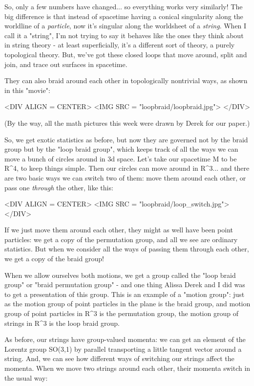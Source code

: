 So, only a few numbers have changed... so everything works very
similarly!  The big difference is that instead of spacetime having a
conical singularity along the worldline of a \emph{particle}, now
it's singular along the worldsheet of a \emph{string}.  When I call
it a "string", I'm not trying to say it behaves like the
ones they think about in string theory - at least superficially, it's
a different sort of theory, a purely topological theory. But, we've
got these closed loops that move around, split and join, and trace out
surfaces in spacetime.

They can also braid around each other in topologically nontrivial
ways, as shown in this "movie": 

<DIV ALIGN = CENTER>
<IMG SRC = "loopbraid/loopbraid.jpg">
</DIV>

(By the way, all the math pictures this week were drawn by 
Derek for our paper.)

So, we get exotic statistics as before, but now they are governed not by
the braid group but by the "loop braid group", which keeps
track of all the ways we can move a bunch of circles around in 3d
space.  Let's take our spacetime M to be R^{4}, to keep things simple.
Then our circles can move around in R^{3}... and there are 
two basic ways we can switch two of them: move them around each other, 
or pass one \emph{through} the other, like this:

<DIV ALIGN = CENTER>
<IMG SRC = "loopbraid/loop_switch.jpg">
</DIV>

If we just move them around each other, they might as well have been 
point particles: we get a copy of the permutation group, and all we see 
are ordinary statistics.  But when we consider all the ways of passing
them through each other, we get a copy of the braid group!  

When we allow ourselves both motions, we get a group called the
"loop braid group" or "braid permutation group" -
and one thing Alissa Derek and I did was to get a presentation of this
group.  This is an example of a "motion group": just as the
motion group of point particles in the plane is the braid group, and
motion group of point particles in R^{3} is the permutation group, the
motion group of strings in R^{3} is the loop braid group.

As before, our strings have group-valued momenta: we can get an 
element of the Lorentz group SO(3,1) by parallel transporting a
little tangent vector around a string.  And, we can see how 
different ways of switching our strings affect the momenta.  
When we move two strings around each other, their momenta switch
in the usual way:

